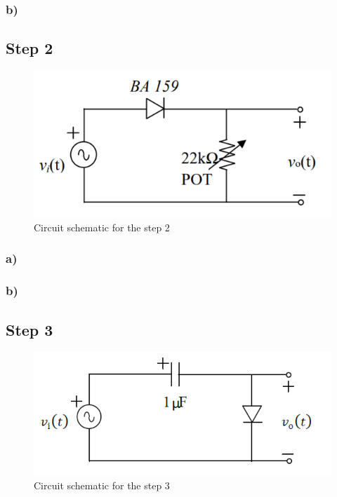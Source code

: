 \documentclass[letterpaper,12pt]{article}
\begin{document}
\subsubsection{b)}

\subsection{Step 2}

\begin{figure}[H]
    \centering
    \includegraphics[width=1\textwidth]{2_1.png}
    \caption{Circuit schematic for the step 2}
\end{figure} 
    
\subsubsection{a)}
\subsubsection{b)}


\subsection{Step 3}

\begin{figure}[H]
    \centering
    \includegraphics[width=1\textwidth]{3_1.png}
    \caption{Circuit schematic for the step 3}
\end{figure} 
    
\end{document}
